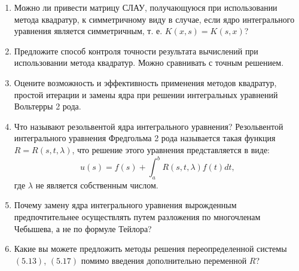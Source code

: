 \documentclass[12pt, a4paper]{article}
\begin{document}
\begin{enumerate}
\item Можно ли привести матрицу СЛАУ, получающуюся при использовании метода квадратур, к симметричному виду в случае, если ядро интегрального уравнения является симметричным, т. е. $ K(x, s) = K(s, x) $?

\item Предложите способ контроля точности результата вычислений при использовании метода квадратур.
Можно сравнивать с точным решением.

\item Оцените возможность и эффективность применения методов квадратур, простой итерации и замены ядра при решении интегральных уравнений Вольтерры 2 рода.

\item Что называют резольвентой ядра интегрального уравнения?
Резольвентой интегрального уравнения Фредгольма 2 рода называется такая функция $ R = R(s, t, \lambda) $, что решение этого уравнения представляется в виде:
\[
u(s) = f(s) + \displaystyle \int_a^b R(s, t, \lambda) f(t) dt,
\]
где $\lambda$ не является собственным числом.
\item Почему замену ядра интегрального уравнения вырожденным предпочтительнее осуществлять путем разложения по многочленам Чебышева, а не по формуле Тейлора?

\item Какие вы можете предложить методы решения переопределенной системы $ (5.13) $, $ (5.17) $ помимо введения дополнительно переменной $ R $?
\end{enumerate}

\newpage
\end{document}
